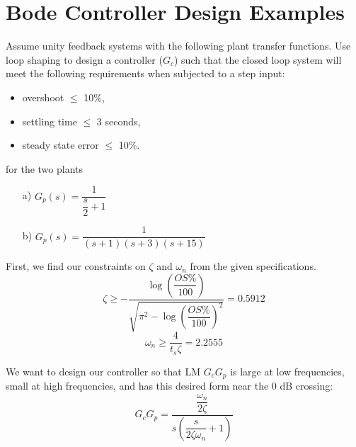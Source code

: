 \documentclass{book}
\begin{document}
\section*{Bode Controller Design Examples}
Assume unity feedback systems with the following plant transfer functions. Use loop shaping to design a controller ($ G_c $) such that the closed loop system will meet the following requirements when subjected to a step input:
\begin{itemize}
	\item overshoot $ \leq $ 10\%,
	\item settling time $ \leq $ 3 seconds,
	\item steady state error $ \leq $ 10\%.
\end{itemize}
for the two plants
\begin{enumerate}
	\item[a)] $ G_p(s)=\dfrac{1}{\dfrac{s}{2}+1} $ 
	\item[b)] $ G_p(s)=\dfrac{1}{(s+1)(s+3)(s+15)} $ 
\end{enumerate}

First, we find our constraints on $ \zeta $ and $ \omega_n $ from the given specifications. 
\begin{equation}
	\zeta \geq - \dfrac{\log\left(\dfrac{OS\%}{100}\right)}{\sqrt{\pi^2-\log\left(\dfrac{OS\%}{100}\right)^2}}=0.5912
\end{equation}
\begin{equation}
	\omega_n \geq \dfrac{4}{t_s\zeta} = 2.2555
\end{equation}

We want to design our controller so that LM $ G_c G_p $ is large at low frequencies, small at high frequencies, and has this desired form near the 0 dB crossing:
\begin{equation}
	G_cG_p = \dfrac{\dfrac{\omega_n}{2\zeta}}{s\left(\dfrac{s}{2\zeta\omega_n}+1\right)}
\end{equation}
\end{document}
